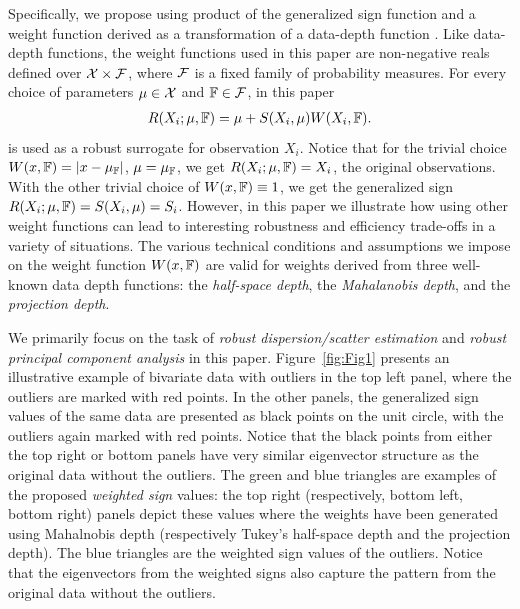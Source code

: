 Specifically, we propose using product of the generalized sign function and a 
weight function derived as a transformation of a data-depth function 
\citep{ref:AoS00461_ZuoSerfling, ref:DIMACS061_Serfling}.
 Like data-depth functions, the weight functions 
used in this paper are non-negative reals defined over $\mathcal{X} \times \mathcal{F}$, where 
$\mathcal{F}$ is a fixed family of probability measures.
For every choice of parameters $\mu \in \mathcal{X}$ and ${\mathbb{F}} \in \mathcal{F}$, in this paper
\begin{align}
R (X_{i}; \mu, {\mathbb{F}}) = \mu +  S( X_{i}, \mu) W( X_{i}, {\mathbb{F}}).
\label{eqn:rank}
\end{align}
is used as a robust surrogate for observation $X_{i}$.
Notice that for the trivial choice $W( x, {\mathbb{F}}) = | x - \mu_{{\mathbb{F}}} |$, 
 $\mu = \mu_{{\mathbb{F}}}$,  we get $R (X_{i}; \mu, {\mathbb{F}}) = X_{i}$, the original observations. 
 With the other trivial choice of  $W( x, {\mathbb{F}}) \equiv 1$, we get the 
 generalized  sign $R (X_{i}; \mu, {\mathbb{F}}) = S(X_{i}, \mu) = S_{i}$. 
 However, in this paper we illustrate how using other weight functions
 can lead to interesting robustness and efficiency trade-offs in a variety of situations. 
 The various technical conditions and assumptions we impose on the 
 weight function $W( x, {\mathbb{F}})$ are valid for weights derived 
 from three well-known data depth functions: the \textit{half-space depth}, 
 the \textit{Mahalanobis depth}, and the \textit{projection depth}. 
 
We primarily focus on the task of \textit{robust dispersion/scatter estimation} and 
\textit{robust principal component analysis} in 
this paper. Figure~\ref{fig:Fig1} presents an illustrative example of bivariate data with 
outliers in the top left panel, where the outliers are marked with red points. In the 
other panels, the generalized sign values of the same data are presented as black points 
on the unit circle, with the outliers again marked with red points. Notice that the 
black points from either the top right or bottom panels have very similar eigenvector 
structure as the original data without the outliers. The green and blue triangles 
are examples of 
the proposed \textit{weighted sign} values: the top right (respectively, bottom left, 
bottom right) panels depict these values where the weights have been generated using 
Mahalnobis depth (respectively Tukey's half-space depth and the projection depth). The 
blue triangles are the weighted sign values of the outliers. Notice that the eigenvectors 
from the weighted signs also capture the pattern from the original data without the 
outliers.


